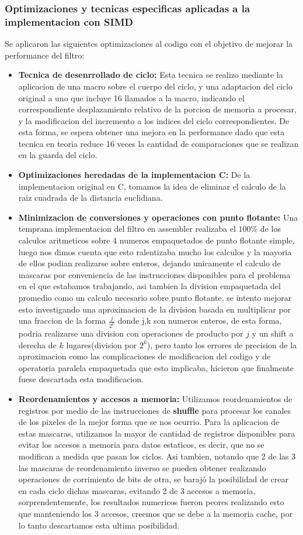 \subsubsection{Optimizaciones y tecnicas especificas aplicadas a la implementacion con SIMD}
Se aplicaron las siguientes optimizaciones al codigo con el objetivo de mejorar la performance del filtro:
\begin{itemize}
    \item \textbf{Tecnica de desenrrollado de ciclo: }Esta tecnica se realizo mediante la aplicacion de una macro sobre el cuerpo del ciclo, y una adaptacion del ciclo original a uno que incluye 16 llamados a la macro, indicando el correspondiente desplazamiento relativo de la porcion de memoria a procesar, y la modificacion del incremento a los indices del ciclo correspondientes.
    De esta forma, se espera obtener una mejora en la performance dado que esta tecnica en teoria reduce 16 veces la cantidad de comparaciones que se realizan en la guarda del ciclo.
    \item \textbf{Optimizaciones heredadas de la implementacion C:} De la implementacion original en C, tomamos la idea de eliminar el calculo de la raiz cuadrada de la distancia euclidiana. 
    \item \textbf{Minimizacion de conversiones y operaciones con punto flotante: } Una temprana implementacion del filtro en assembler realizaba el $100\%$ de los calculos aritmeticos sobre 4 numeros empaquetados de punto flotante simple, luego nos dimos cuenta que esto ralentizaba mucho los calculos y la mayoria de ellos podian realizarse sobre enteros, dejando unicamente el calculo de mascaras por conveniencia de las instrucciones disponibles para el problema en el que estabamos trabajando, asi tambien la division empaquetada del promedio como un calculo necesario sobre punto flotante, se intento mejorar esto investigando una aproximacion de la division basada en multiplicar por una fraccion de la forma $\frac{j}{2^k}$ donde j,k son numeros enteros, de esta forma, podria realizarse una division con operaciones de producto por $j$ y un shift a derecha de $k$ lugares(division por $2^k$), pero tanto los errores de precision de la aproximacion como las complicaciones de modificacion del codigo y de operatoria paralela empaquetada que esto implicaba, hicieron que finalmente fuese descartada esta modificacion.
    \item \textbf{Reordenamientos y accesos a memoria: } Utilizamos reordenamientos de registros por medio de las instrucciones de \textbf{shuffle} para procesar los canales de los pixeles de la mejor forma que se nos ocurrio. Para la aplicacion de estas mascaras, utilizamos la mayor de cantidad de registros disponibles para evitar los accesos a memoria para datos estaticos, es decir, que no se modifican a medida que pasan los ciclos. Asi tambien, notando que 2 de las 3 las mascaras de reordenamiento inverso se pueden obtener realizando operaciones de corrimiento de bits de otra, se barajó la posibilidad de crear en cada ciclo dichas mascaras, evitando 2 de 3 accesos a memoria, sorprendentemente, los resultados numericos fueron peores realizando esto que manteniendo los 3 accesos, creemos que se debe a la memoria cache, por lo tanto descartamos esta ultima posibilidad.

\end{itemize}
